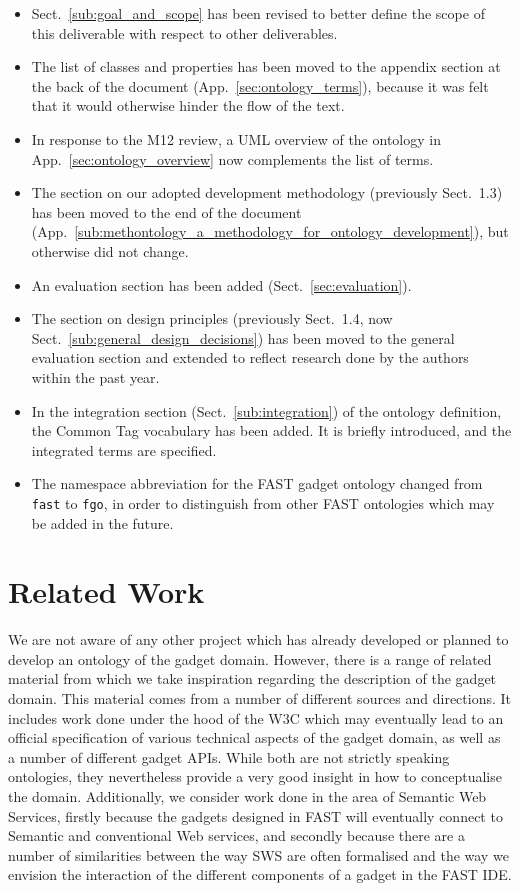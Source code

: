 \documentclass[twoside]{fast_latex}
\begin{document}
\begin{itemize}
	\item Sect.~\ref{sub:goal_and_scope} has been revised to better define the scope of this deliverable with respect to other deliverables.
	\item The list of classes and properties has been moved to the appendix section at the back of the document (App.~\ref{sec:ontology_terms}), because it was felt that it would otherwise hinder the flow of the text.
	\item In response to the M12 review, a UML overview of the ontology in App.~\ref{sec:ontology_overview} now complements the list of terms.
	\item The section on our adopted development methodology (previously Sect.~1.3) has been moved to the end of the document (App.~\ref{sub:methontology_a_methodology_for_ontology_development}), but otherwise did not change.
	\item An evaluation section has been added (Sect.~\ref{sec:evaluation}).
	\item The section on design principles (previously Sect.~1.4, now Sect.~\ref{sub:general_design_decisions}) has been moved to the general evaluation section and extended to reflect research done by the authors within the past year.
	\item In the integration section (Sect.~\ref{sub:integration}) of the ontology definition, the Common Tag vocabulary has been added. It is briefly introduced, and the integrated terms are specified.
	\item The namespace abbreviation for the FAST gadget ontology changed from \texttt{fast} to \texttt{fgo}, in order to distinguish from other FAST ontologies which may be added in the future.
\end{itemize}



\section{Related Work} %
\label{sec:related_work}

We are not aware of any other project which has already developed or planned to develop an ontology of the gadget domain. However, there is a range of related material from which we take inspiration regarding the description of the gadget domain. This material comes from a number of different sources and directions. It includes work done under the hood of the W3C which may eventually lead to an official specification of various technical aspects of the gadget domain, as well as a number of different gadget APIs. While both are not strictly speaking ontologies, they nevertheless provide a very good insight in how to conceptualise the domain. Additionally, we consider work done in the area of Semantic Web Services, firstly because the gadgets designed in FAST will eventually connect to Semantic and conventional Web services, and secondly because there are a number of similarities between the way SWS are often formalised and the way we envision the interaction of the different components of a gadget in the FAST IDE.
\end{document}

